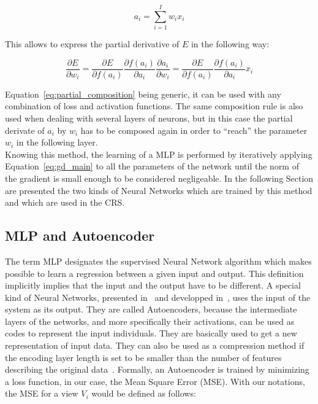     \begin{equation}
        a_i = \sum_{i=1}^I w_i x_i
        \label{eq:weighted_sum}
    \end{equation}

    This allows to express the partial derivative of $E$ in the following way:

    \begin{equation}
        \frac{\partial E}{\partial w_i} = \frac{\partial E}{\partial f\left( a_i\right)} \frac{\partial f(a_i)}{\partial a_i}\frac{\partial a_i}{\partial w_i} = \frac{\partial E}{\partial f\left( a_i\right)} \frac{\partial f(a_i)}{\partial a_i} x_i
        \label{eq:partial_composition}
    \end{equation}

    Equation~\ref{eq:partial_composition} being generic, it can be used with any combination of loss and activation functions. The same composition rule is also used when dealing with several layers of neurons, but in this case the partial derivate of $a_i$ by $w_i$ has to be composed again in order to ``reach'' the parameter $w_i$ in the following layer.\\

    Knowing this method, the learning of a MLP is performed by iteratively applying Equation~\ref{eq:gd_main} to all the parameters of the network until the norm of the gradient is small enough to be considered negligeable. In the following Section are presented the two kinds of Neural Networks which are trained by this method and which are used in the CRS.\@

    \subsection{MLP and Autoencoder}

    The term MLP designates the supervised Neural Network algorithm which makes possible to learn a regression between a given input and output. This definition implicitly implies that the input and the output have to be different. A special kind of Neural Networks, presented in~\cite{hinton2006reducing} and developped in~\cite{vincent2008extracting}, uses the input of the system as its output. They are called Autoencoders, because the intermediate layers of the networks, and more specifically their activations, can be used as codes to represent the input individuals. They are basically used to get a new representation of input data. They can also be used as a compression method if the encoding layer length is set to be smaller than the number of features describing the original data~\cite{hinton2006reducing}. Formally, an Autoencoder is trained by minimizing a loss function, in our case, the Mean Square Error (MSE). With our notations, the MSE for a view $V_i$ would be defined as follows:
		
